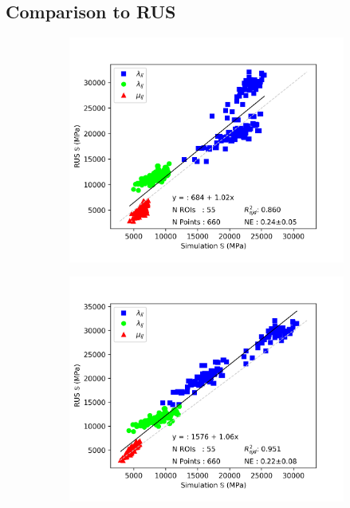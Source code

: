 \documentclass[a4paper,fleqn]{DC_ArtStyle}
\begin{document}
	\subsection{Comparison to RUS}
	\begin{figure}[!h]
		\begin{subfigure}[b]{0.45\linewidth}
			\includegraphics[width=\linewidth]{Elasticity_IsoRUS}
		\end{subfigure}
		\begin{subfigure}[b]{0.45\linewidth}
			\includegraphics[width=\linewidth]{Elasticity_TraRUS}
		\end{subfigure}
	\end{figure}
\end{document}
